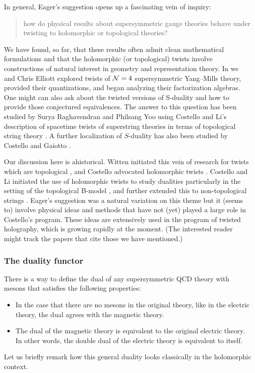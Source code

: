 \documentclass[11pt]{amsart}
\begin{document}
In general, Eager's suggestion opens up a fascinating vein of inquiry:
\begin{quote}
how do physical results about supersymmetric gauge theories behave under twisting to holomorphic or topological theories?
\end{quote}
We have found, so far, that these results often admit clean mathematical formulations and that the holomorphic (or topological) twists involve constructions of natural interest in geometry and representation theory.
In \cite{EGW} we and Chris Elliott explored twists of $\mathcal N=4$ supersymmetric Yang--Mills theory,
provided their quantizations, and began analyzing their factorization algebras.
One might can also ask about the twisted versions of S-duality and how to provide those conjectured equivalences.
The answer to this question has been studied by Surya Raghavendran and Philsang Yoo \cite{RYsduality} using Costello and Li's description of spacetime twists of superstring theories in terms of topological string theory \cite{CLsugra,CLtypeI}. 
A further localization of $S$-duality has also been studied by Costello and Gaiotto \cite{CGholography}.

\begin{rmk}
Our discussion here is ahistorical.
Witten initiated this vein of research for twists which are topological \cite{WittenTwist},
and Costello advocated holomorphic twists \cite{CostelloHol}.  
Costello and Li initiated the use of holomorphic twists to study dualities particularly in the setting of the topological B-model \cite{CLbcov1,CLbcov2,CLbcov3}, and further extended this to non-topological strings \cite{CLsugra}. 
Eager's suggestion was a natural variation on this theme but it (seems to) involve physical ideas and methods that have not (yet) played a large role in Costello's program.
These ideas are extensively used in the program of twisted holography, which is growing rapidly at the moment.
(The interested reader might track the papers that cite those we have mentioned.)
\end{rmk}

\subsubsection{The duality functor} 

There is a way to define the dual of any supersymmetric QCD theory with mesons that satisfies the following properties:
\begin{itemize}
\item In the case that there are no mesons in the original theory, like in the electric theory, the dual agrees with the magnetic theory.
\item The dual of the magnetic theory is equivalent to the original electric theory. In other words, the double dual of the electric theory is equivalent to itself. 
\end{itemize}
Let us briefly remark how this general duality looks classically in the holomorphic context. 
\end{document}

